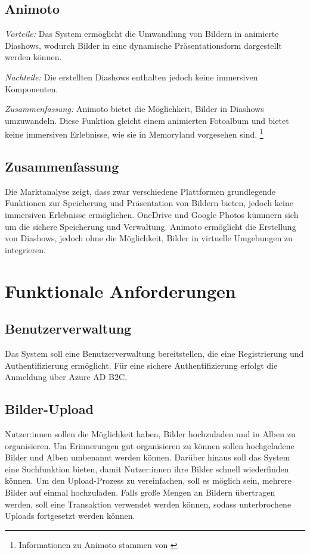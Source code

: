 \subsection{Animoto}

\emph{Vorteile:}
Das System ermöglicht die Umwandlung von Bildern in animierte Diashows,
wodurch Bilder in eine dynamische Präsentationsform dargestellt werden
können.

\emph{Nachteile:}
Die erstellten Diashows enthalten jedoch keine immersiven Komponenten.

\emph{Zusammenfassung:}
Animoto bietet die Möglichkeit, Bilder in Diashows umzuwandeln. Diese Funktion gleicht 
einem animierten Fotoalbum und bietet keine immersiven Erlebnisse, wie sie in Memoryland
vorgesehen sind. \footnote{Informationen zu Animoto stammen von \cite{Animoto}}

\subsection{Zusammenfassung}

Die Marktanalyse zeigt, dass zwar verschiedene Plattformen grundlegende 
Funktionen zur Speicherung und Präsentation von Bildern bieten, jedoch 
keine immersiven Erlebnisse ermöglichen. OneDrive und Google Photos kümmern 
sich um die sichere Speicherung und Verwaltung. Animoto ermöglicht die 
Erstellung von Diashows, jedoch ohne die Möglichkeit, Bilder in virtuelle 
Umgebungen zu integrieren.

\section{Funktionale Anforderungen}

\subsection{Benutzerverwaltung}

Das System soll eine Benutzerverwaltung bereitstellen, die eine Registrierung 
und Authentifizierung ermöglicht. Für eine sichere Authentifizierung erfolgt
die Anmeldung über Azure AD B2C.

\subsection{Bilder-Upload}

Nutzer:innen sollen die Möglichkeit haben, Bilder hochzuladen und in Alben zu organisieren. 
Um Erinnerungen gut organisieren zu können sollen hochgeladene Bilder und Alben 
umbenannt werden können. Darüber hinaus soll das System eine Suchfunktion bieten, 
damit Nutzer:innen ihre Bilder schnell wiederfinden können. Um den Upload-Prozess zu 
vereinfachen, soll es möglich sein, mehrere Bilder auf einmal hochzuladen. Falls 
gro\ss{}e Mengen an Bildern übertragen werden, soll eine Transaktion verwendet werden
können, sodass unterbrochene Uploads fortgesetzt werden können.

